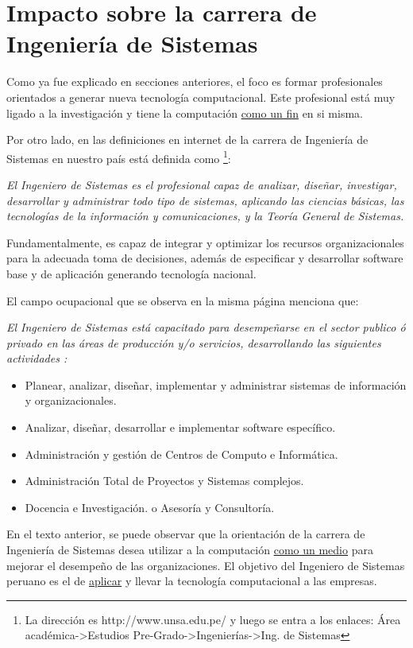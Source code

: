 \section{Impacto sobre la carrera de Ingeniería de Sistemas}\label{sec:impacto-en-sistemas}
Como ya fue explicado en secciones anteriores, el foco es formar
profesionales orientados a generar nueva tecnología computacional.
Este profesional está muy ligado a la investigación y tiene la
computación \underline{como un fin} en si misma.

Por otro lado, en las definiciones en internet de la carrera de Ingeniería de Sistemas en nuestro país está definida como \footnote{La
dirección es http://www.unsa.edu.pe/ y luego se entra a los enlaces:
Área académica->Estudios Pre-Grado->Ingenierías->Ing. de Sistemas}:

{\it El Ingeniero de Sistemas es el profesional capaz de analizar, diseñar, investigar, desarrollar y administrar todo tipo de sistemas, aplicando las ciencias básicas, las tecnologías de la información y comunicaciones, y la Teoría General de Sistemas.

Fundamentalmente, es capaz de integrar y optimizar los recursos organizacionales para la adecuada toma de decisiones, además de especificar y desarrollar software base y de aplicación generando tecnología nacional.}

El campo ocupacional que se observa en la misma página menciona que:

{\it El Ingeniero de Sistemas está capacitado para desempeñarse en el sector publico ó privado en las áreas de producción y/o servicios, desarrollando las siguientes actividades :

\begin{itemize}
    \item Planear, analizar, diseñar, implementar y administrar sistemas de información y organizacionales.
    \item Analizar, diseñar, desarrollar e implementar software específico.
    \item Administración y gestión de Centros de Computo e Informática.
    \item Administración Total de Proyectos y Sistemas complejos.
    \item Docencia e Investigación. o Asesoría y Consultoría.
\end{itemize}
}

En el texto anterior, se puede observar que la orientación de la carrera de Ingeniería de Sistemas desea utilizar a la computación \underline{como un medio} para mejorar el desempeño de las organizaciones. El objetivo del Ingeniero de Sistemas peruano es el de \underline{aplicar} y llevar la tecnología computacional a las empresas.

